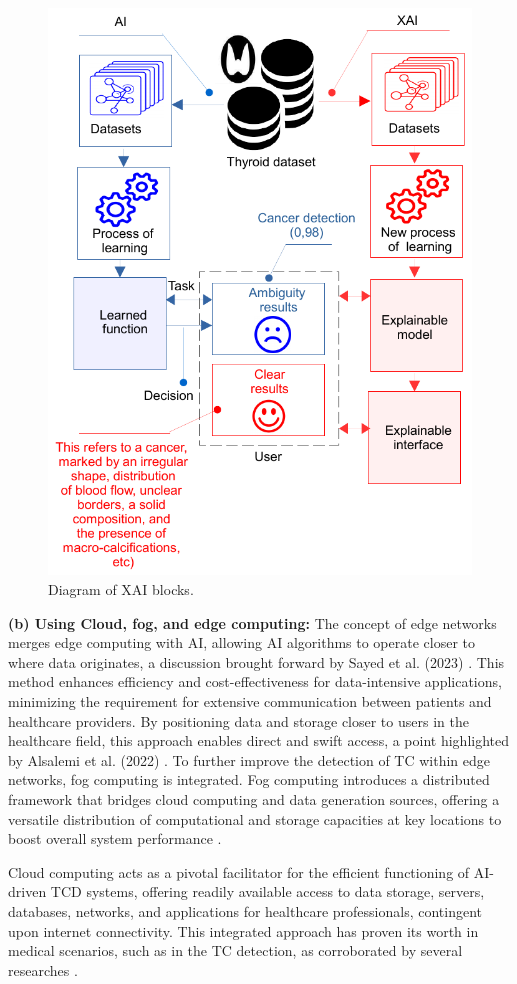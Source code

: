 \documentclass[a4paper,fleqn]{cas-sc}
\begin{document}
\begin{figure}[t!]
\centering
\includegraphics[width=0.5\columnwidth]{fig12.pdf}
\caption{Diagram of \ac{XAI} blocks. }
\label{fig12}
\end{figure}



\vskip2mm
\noindent \textbf{(b) Using Cloud, fog, and edge  computing: } 
The concept of edge networks merges edge computing with AI, allowing AI algorithms to operate closer to where data originates, a discussion brought forward by Sayed et al. (2023) \cite{sayed2023edge}. This method enhances efficiency and cost-effectiveness for data-intensive applications, minimizing the requirement for extensive communication between patients and healthcare providers. By positioning data and storage closer to users in the healthcare field, this approach enables direct and swift access, a point highlighted by Alsalemi et al. (2022) \cite{alsalemi2022innovative}. To further improve the detection of \ac{TC} within edge networks, fog computing is integrated. Fog computing introduces a distributed framework that bridges cloud computing and data generation sources, offering a versatile distribution of computational and storage capacities at key locations to boost overall system performance \cite{sayed2021intelligent}.

Cloud computing acts as a pivotal facilitator for the efficient functioning of AI-driven \ac{TCD} systems, offering readily available access to data storage, servers, databases, networks, and applications for healthcare professionals, contingent upon internet connectivity. This integrated approach has proven its worth in medical scenarios, such as in the TC detection, as corroborated by several researches \cite{charteros2020edge, sufian2020survey, chen2018disease, chai2020diagnosis, jagtap2016online, anuradha2021iot, kevco2018cloud, rajan2020fog, mutlag2019enabling, hartmann2019edge, corchado2019ai}.
\end{document}
